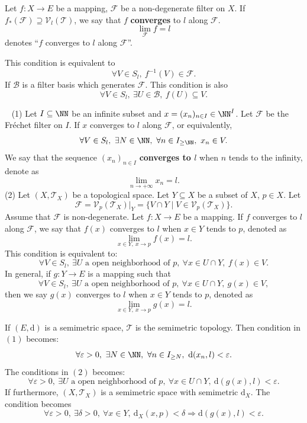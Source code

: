 \begin{definitionenv}
    Let $f:X\longrightarrow E$ be a mapping, $\mathcal{F}$ be a non-degenerate filter on $X$. If $f_*(\mathcal{F})\supseteq \mathcal{V}_l(\mathscr{T})$, we say that $f$ \textbf{converges} to $l$ along $\mathcal{F}$.
    $$\lim_{\mathcal{F}}f=l $$
    denotes ``$f$ converges to $l$ along $\mathcal{F}$''.

    This condition is equivalent to 
    $$\forall V\in S_l,\ f^{-1}(V)\in \mathcal{F}.$$
    If $\mathcal{B}$ is a filter basis which generates $\mathcal{F}$. This condition is also 
    $$\forall V\in S_l,\ \exists U\in \mathcal{B},\ f(U)\subseteq V.$$
    
\end{definitionenv}
\begin{exampleenv}
    \ \newline
    (1) Let $I\subseteq \NN$ be an infinite subset and $x=(x_n)_{n\in I}\in \NN^I$. Let $\mathcal{F}$ be the Fréchet filter on $I$. If $x$ converges to $l$ along $\mathcal{F}$, or equivalently,
    $$\forall V\in S_l,\ \exists N\in \NN,\ \forall n\in I_{\ge \NN},\ x_n\in V.$$
    We say that the sequence $(x_n)_{n\in I}$ \textbf{converges to $l$} when $n$ tends to the infinity, denote as 
    $$\lim_{n\rightarrow+\infty}x_n=l.$$
    \newline
    (2) Let $(X,\mathscr{T}_X)$ be a topological space. Let $Y\subseteq X$ be a subset of $X$, $p\in X$. Let 
    $$\mathcal{F}=\mathcal{V}_p(\mathscr{T}_X)|_Y=\{V\cap Y\mid V\in \mathcal{V}_p(\mathscr{T}_X)\}.$$
    Assume that $\mathcal{F}$ is non-degenerate. Let $f:X\longrightarrow E$ be a mapping. If $f$ converges to $l$ along $\mathcal{F}$, we say that $f(x)$ converges to $l$ when $x\in Y$ tends to $p$, denoted as 
    $$\lim_{x\in Y,\ x\rightarrow p}f(x)=l.$$
    This condition is equivalent to:
    $$\forall V\in S_l,\ \exists U \text{ a open neighborhood of }p, \ \forall x\in U\cap Y, \ f(x)\in V.$$
    In general, if $g:Y\longrightarrow E$ is a mapping such that
    $$\forall V\in S_l,\ \exists U \text{ a open neighborhood of }p, \ \forall x\in U\cap Y, \ g(x)\in V,$$
    then we say $g(x)$ converges to $l$ when $x\in Y$ tends to $p$, denoted as 
    $$\lim_{x\in Y,\ x\rightarrow p}g(x)=l.$$
\end{exampleenv}
\begin{remark}
    If $(E,\mathrm{d})$ is a semimetric space, $\mathscr{T}$ is the semimetric topology. Then condition in $(1)$ becomes:
    $$\forall \varepsilon >0,\ \exists N\in \NN,\ \forall n\in I_{\ge N},\ \mathrm{d}(x_n,l)<\varepsilon.$$
    The conditions in $(2)$ becomes:
    $$\forall \varepsilon >0,\ \exists U \text{ a open neighborhood of }p, \ \forall x\in U\cap Y, \ \mathrm{d}(g(x),l)<\varepsilon.$$
    If furthermore, $(X,\mathscr{T}_X)$ is a semimetric space with semimetric $\mathrm{d}_X$. The condition becomes 
    $$\forall \varepsilon>0,\ \exists \delta>0,\ \forall x\in Y,\ \mathrm{d}_X(x,p)<\delta\Rightarrow \mathrm{d}(g(x),l)<\varepsilon.$$
\end{remark}
